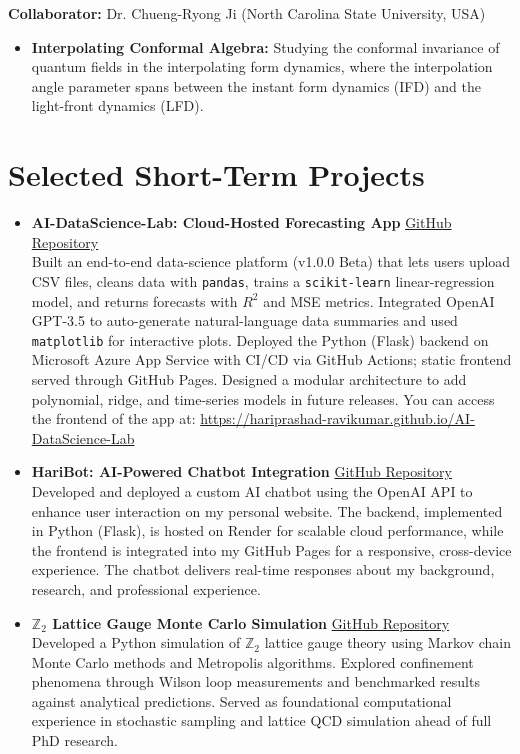 \documentclass[11pt]{article}
\begin{document}
\textbf{Collaborator:} Dr. Chueng-Ryong Ji (North Carolina State University, USA)
\begin{itemize}
    \item \textbf{Interpolating Conformal Algebra:} Studying the conformal invariance of quantum fields in the interpolating form dynamics, where the interpolation angle parameter spans between the instant form dynamics (IFD) and the light-front dynamics (LFD).
\end{itemize}
%
\section*{Selected Short-Term Projects}
\vspace{-0.3em}

\begin{itemize}
    \item \textbf{AI-DataScience-Lab: Cloud-Hosted Forecasting App} \hfill \href{https://github.com/Hariprashad-Ravikumar/AI-DataScience-Lab}{GitHub Repository} \\
    Built an end-to-end data-science platform (v1.0.0 Beta) that lets users upload CSV files, cleans data with \texttt{pandas}, trains a \texttt{scikit-learn} linear-regression model, and returns forecasts with $R^{2}$ and MSE metrics. Integrated OpenAI GPT-3.5 to auto-generate natural-language data summaries and used \texttt{matplotlib} for interactive plots. Deployed the Python (Flask) backend on Microsoft Azure App Service with CI/CD via GitHub Actions; static frontend served through GitHub Pages. Designed a modular architecture to add polynomial, ridge, and time-series models in future releases. You can access the frontend of the app at: \href{https://hariprashad-ravikumar.github.io/AI-DataScience-Lab}{https://hariprashad-ravikumar.github.io/AI-DataScience-Lab}
          
    \item \textbf{HariBot: AI-Powered Chatbot Integration} \hfill \href{https://github.com/Hariprashad-Ravikumar/Hari-ChatBot}{GitHub Repository} \\
    Developed and deployed a custom AI chatbot using the OpenAI API to enhance user interaction on my personal website. The backend, implemented in Python (Flask), is hosted on Render for scalable cloud performance, while the frontend is integrated into my GitHub Pages for a responsive, cross-device experience. The chatbot delivers real-time responses about my background, research, and professional experience.
    \item \textbf{$\mathbb{Z}_2$ Lattice Gauge Monte Carlo Simulation} \hfill \href{https://github.com/Hariprashad-Ravikumar/Z2_LatticeGauge_Monte_Carlo_Simulation}{GitHub Repository} \\
    Developed a Python simulation of $\mathbb{Z}_2$ lattice gauge theory using Markov chain Monte Carlo methods and Metropolis algorithms. Explored confinement phenomena through Wilson loop measurements and benchmarked results against analytical predictions. Served as foundational computational experience in stochastic sampling and lattice QCD simulation ahead of full PhD research.
\end{itemize}
\end{document}
